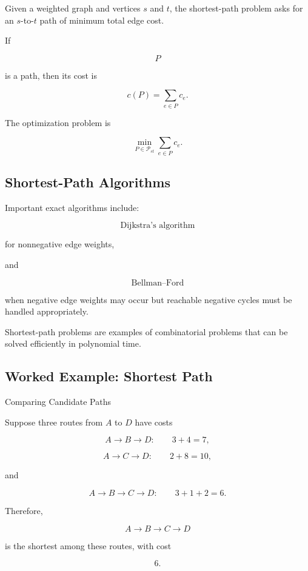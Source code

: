 Given a weighted graph and vertices \(s\) and \(t\), the shortest-path
problem asks for an \(s\)-to-\(t\) path of minimum total edge cost.

If

\[
P
\]

is a path, then its cost is

\[
\boxed{
c(P)
=
\sum_{e\in P}
c_e.
}
\]

The optimization problem is

\[
\boxed{
\min_{P\in\mathcal{P}_{st}}
\sum_{e\in P}
c_e.
}
\]

\subsection{Shortest-Path Algorithms}
\label{subsec:shortest-path-algorithms-combinatorial}

Important exact algorithms include:

\[
\boxed{
\text{Dijkstra's algorithm}
}
\]

for nonnegative edge weights,

and

\[
\boxed{
\text{Bellman--Ford}
}
\]

when negative edge weights may occur but reachable negative cycles must be
handled appropriately.

Shortest-path problems are examples of combinatorial problems that can be
solved efficiently in polynomial time.

\subsection{Worked Example: Shortest Path}
\label{subsec:worked-shortest-path-combinatorial}

\begin{workedexamplebox}{Comparing Candidate Paths}

Suppose three routes from \(A\) to \(D\) have costs

\[
A\to B\to D:
\qquad
3+4=7,
\]

\[
A\to C\to D:
\qquad
2+8=10,
\]

and

\[
A\to B\to C\to D:
\qquad
3+1+2=6.
\]

Therefore,

\begin{answerbox}
\[
\boxed{
A\to B\to C\to D
}
\]

is the shortest among these routes, with cost

\[
\boxed{
6.
}
\]
\end{answerbox}

\end{workedexamplebox}

